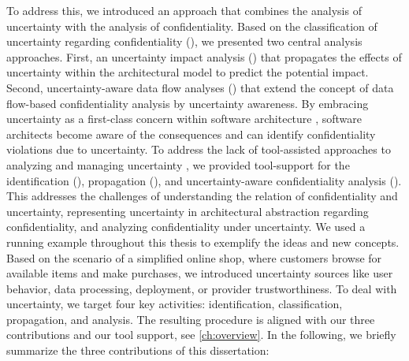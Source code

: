 To address this, we introduced an approach that combines the analysis of uncertainty with the analysis of confidentiality.
Based on the classification of uncertainty regarding confidentiality (), we presented two central analysis approaches.
First, an uncertainty impact analysis () that propagates the effects of uncertainty within the architectural model to predict the potential impact.
Second, uncertainty-aware data flow analyses () that extend the concept of data flow-based confidentiality analysis \cite{seifermann_data-driven_2019,seifermann_detecting_2022,seifermann_architectural_2022,boltz_extensible_2024} by uncertainty awareness.
By embracing uncertainty as a first-class concern within software architecture \cite{garlan_software_2010}, software architects become aware of the consequences and can identify confidentiality violations due to uncertainty.
To address the lack of tool-assisted approaches to analyzing and managing uncertainty \cite{troya_uncertainty_2021,hezavehi_uncertainty_2021}, we provided tool-support for the identification (\arcen), propagation (\uia), and uncertainty-aware confidentiality analysis (\abunai).
This addresses the challenges \cite{hahner_dealing_2021} of understanding the relation of confidentiality and uncertainty, representing uncertainty in architectural abstraction regarding confidentiality, and analyzing confidentiality under uncertainty.
We used a running example throughout this thesis to exemplify the ideas and new concepts.
Based on the scenario of a simplified online shop, where customers browse for available items and make purchases, we introduced uncertainty sources like user behavior, data processing, deployment, or provider trustworthiness.
To deal with uncertainty, we target four key activities: identification, classification, propagation, and analysis.
The resulting procedure is aligned with our three contributions and our tool support, see \autoref{ch:overview}.
In the following, we briefly summarize the three contributions of this dissertation:


